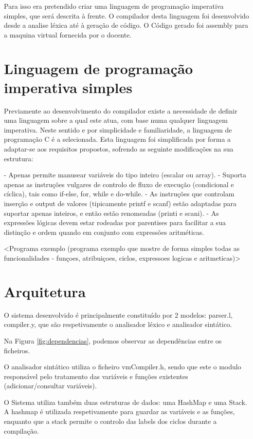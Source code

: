 \documentclass[a4paper,10pt]{report}
\begin{document}
Para isso era pretendido criar uma linguagem de programação imperativa simples, que será descrita à frente.
O compilador desta linguagem foi desenvolvido desde a analise léxica até à geração de código. O Código gerado foi assembly para a maquina virtual fornecida por o docente.


\section{Linguagem de programação imperativa simples}
    Previamente ao desenvolvimento do compilador existe a necessidade de definir uma linguagem sobre a qual este atua, com base numa qualquer linguagem imperativa. Neste sentido e por simplicidade e familiaridade, a linguagem de programação C é a selecionada. Esta linguagem foi simplificada por forma a adaptar-se aos requisitos propostos, sofrendo as seguinte modificações na sua estrutura:

    - Apenas permite manusear variáveis do tipo inteiro (escalar ou array).
    - Suporta apenas as instruções vulgares de controlo de fluxo de execução (condicional e cíclica), tais como if-else, for, while e do-while.
    - As instruções que controlam inserção e output de valores (tipicamente printf e scanf) estão adaptadas para suportar apenas inteiros, e então estão renomeadas (printi e scani).
    - As expressões lógicas devem estar rodeadas por parentises para facilitar a sua distinção e ordem quando em conjunto com expressões aritméticas. 


    <Programa exemplo (programa exemplo que mostre de forma simples todas as funcionalidades - funçoes, atribuiçoes, ciclos, expressoes logicas e aritmeticas)> 

\section{Arquitetura}
    O sistema desenvolvido é principalmente constituído por 2 modelos:  parser.l, compiler.y, que são respetivamente o analisador léxico e analisador sintático. 

    Na Figura \ref{fig:dependencias}, podemos observar as dependências entre os ficheiros.

    O analisador sintático utiliza o ficheiro vmCompiler.h, sendo que este o modulo responsável pelo tratamento das variáveis e funções existentes (adicionar/consultar variáveis).

    O Sistema utiliza também duas estruturas de dados: uma HashMap e uma Stack. A hashmap é utilizada respetivamente para guardar as variáveis e as funções, enquanto que a stack permite o controlo das labels dos ciclos durante a compilação.
\end{document}
